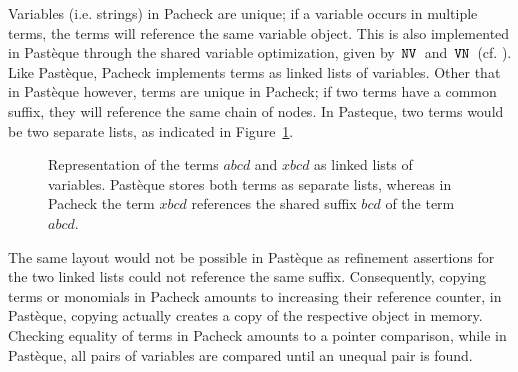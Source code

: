 Variables (i.e. strings) in Pacheck are unique; if a variable occurs in multiple terms, the terms will reference the same variable object.
This is also implemented in Pastèque through the shared variable optimization, given by $\,\text{\ttfamily NV}\,$ and $\,\text{\ttfamily VN}\,$ (cf. ).
Like Pastèque, Pacheck implements terms as linked lists of variables.
Other that in Pastèque however, terms are unique in Pacheck; if two terms have a common suffix, they will reference the same chain of nodes.
In Pasteque, two terms would be two separate lists, as indicated in Figure~\ref{fig:pacheck-shared-suffix}.
\begin{figure}[htbp]
	\centering
	\caption{Representation of the terms $abcd$ and $xbcd$ as linked lists of variables.
		Pastèque stores both terms as separate lists, whereas in Pacheck the term $xbcd$ references the shared suffix $bcd$ of the term $abcd$.}
	\label{fig:pacheck-shared-suffix}
\end{figure}
The same layout would not be possible in Pastèque as refinement assertions for the two linked lists could not reference the same suffix.
Consequently, copying terms or monomials in Pacheck amounts to increasing their reference counter, in Pastèque, copying actually creates a copy of the respective object in memory.
Checking equality of terms in Pacheck amounts to a pointer comparison, while in Pastèque, all pairs of variables are compared until an unequal pair is found.

